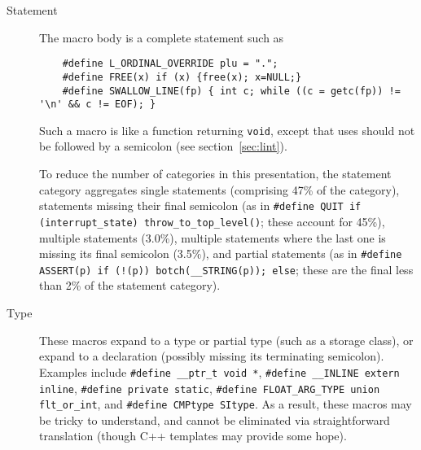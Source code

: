 \begin{description}
\item[Statement]\label{item:statement-category}
  The macro body is a complete statement such as
\begin{verbatim}
    #define L_ORDINAL_OVERRIDE plu = ".";
    #define FREE(x) if (x) {free(x); x=NULL;}
    #define SWALLOW_LINE(fp) { int c; while ((c = getc(fp)) != '\n' && c != EOF); }
\end{verbatim}
  Such a macro is like a function returning {\tt void}, except that uses
  should not be followed by a semicolon (see section~\ref{sec:lint}).
    
  To reduce the number of categories in this presentation, the statement
  category aggregates single statements (comprising 47\% of the category),
  statements missing their final semicolon (as in {\tt \#define QUIT if
  (\verb|interrupt_state|) \verb|throw_to_top_level|()}; these account
  for 45\%), multiple statements (3.0\%), multiple statements where the
  last one is missing its final semicolon (3.5\%), and partial statements
  (as in {\tt \#define ASSERT(p) if (!(p)) botch(\verb|__STRING|(p));
  else}; these are the final less than 2\% of the statement category).

\item[Type] 
  These macros expand to a type or partial type (such as a storage class),
  or expand to a declaration (possibly missing its terminating semicolon).
  Examples include {\tt \#define \verb|__ptr_t|
  void~*}, {\tt \#define \verb|__INLINE| extern inline}, {\tt \#define
private static}, {\tt \#define \verb|FLOAT_ARG_TYPE| union
\verb|flt_or_int|}, and {\tt \#define CMPtype SItype}.  As a result, these
macros may be tricky to understand, and cannot be eliminated via
straightforward translation (though C++ templates may provide some hope).




\end{description}
